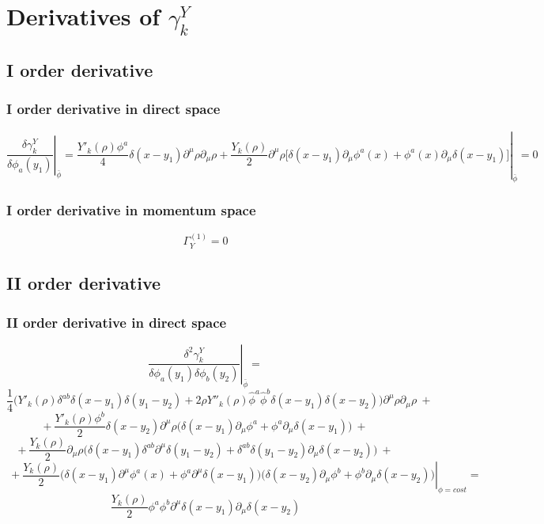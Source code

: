\section{Derivatives of $\gamma_k^{Y}$}
\subsection{I order derivative}
\subsubsection{I order derivative in direct space}
\begin{equation}
\left.\left.\frac{\delta\gamma_k^{Y}}{\delta \phi_a(y_1)}\right|_{\bar{\phi}}= \frac{Y'_k(\rho)\phi^a}{4} \delta(x - y_1) \partial^\mu \rho \partial_\mu \rho + \frac{Y_k(\rho)}{2}\partial^\mu\rho\big[\delta(x - y_1)\partial_\mu\phi^a(x) + \phi^a(x)\partial_\mu\delta(x - y_1)\big]\right|_{\bar{\phi}} = 0
\end{equation} 
\subsubsection{I order derivative in momentum space}
\begin{equation}\label{Y1}
 \Gamma^{(1)}_Y = 0
\end{equation}
\subsection{II order derivative}
\subsubsection{II order derivative in direct space}
\begin{equation}
\left.\frac{\delta^2 \gamma_k^{Y}}{\delta \phi_a(y_1)\delta \phi_b(y_2)}\right|_{\bar{\phi}}  = 
\end{equation}
$$  \frac{1}{4}\big(Y'_k(\rho)\delta^{ab}\delta(x-y_1)\delta(y_1 - y_2) + 2\rho Y''_k(\rho)\widehat{\phi}^a\widehat{\phi}^b\delta(x - y_1)\delta(x - y_2)\big)\partial^\mu\rho\partial_\mu\rho\ + $$
$$ + \ \frac{Y'_k(\rho)\phi^b}{2}\delta(x - y_2)\partial^\mu\rho\big(\delta(x - y_1)\partial_\mu\phi^a + \phi^a\partial_\mu\delta(x - y_1)\big)\ + $$
$$+ \ \frac{Y_k(\rho)}{2}\partial_\mu \rho \big( \delta(x - y_1) \delta^{ab} \partial^\mu \delta(y_1 - y_2) + \delta^{ab} \delta(y_1 - y_2)\partial_\mu\delta(x - y_2) \big) \ +$$
$$\left. \ + \frac{Y_k(\rho)}{2}\big(\delta(x - y_1) \partial^\mu\phi^a(x) + \phi^a\partial^\mu\delta(x - y_1)\big) \big(\delta(x - y_2) \partial_\mu\phi^b + \phi^b\partial_\mu\delta(x - y_2)\big)\right|_{\phi=cost} =$$
$$\frac{Y_k(\rho)}{2}\phi^a\phi^b \partial^\mu\delta(x - y_1)\partial_\mu\delta(x - y_2)$$

